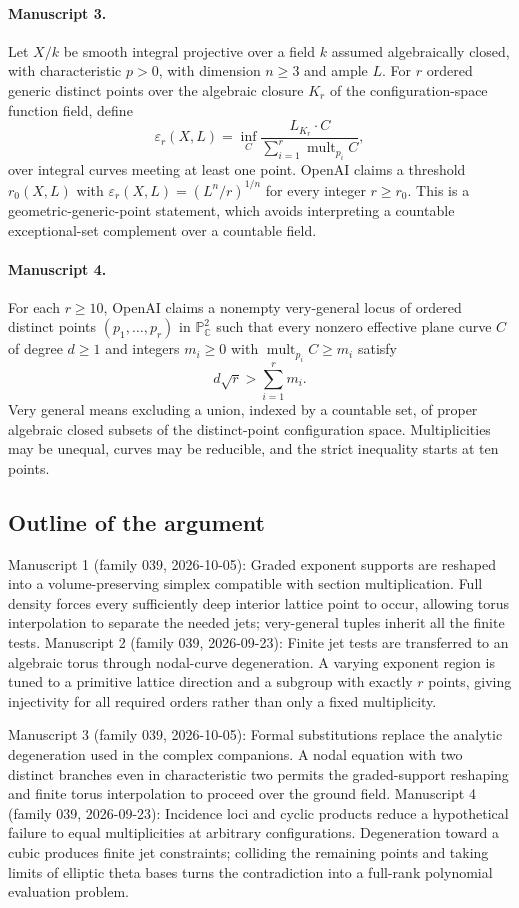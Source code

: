 \documentclass[11pt]{article}
\begin{document}
\paragraph{Manuscript 3.}
Let $X/k$ be smooth integral projective over a field $k$ assumed algebraically closed, with characteristic $p>0$, with dimension $n\ge3$ and ample $L$. For $r$ ordered generic distinct points over the algebraic closure $K_r$ of the configuration-space function field, define
\[
\varepsilon_r(X,L)=\inf_C\frac{L_{K_r}\cdot C}{\sum_{i=1}^r\operatorname{mult}_{p_i}C},
\]
over integral curves meeting at least one point. OpenAI claims a threshold $r_0(X,L)$ with $\varepsilon_r(X,L)=(L^n/r)^{1/n}$ for every integer $r\ge r_0$. This is a geometric-generic-point statement, which avoids interpreting a countable exceptional-set complement over a countable field.

\paragraph{Manuscript 4.}
For each $r\ge10$, OpenAI claims a nonempty very-general locus of ordered distinct points $(p_1,\ldots,p_r)$ in $\mathbb P^2_{\mathbb C}$ such that every nonzero effective plane curve $C$ of degree $d\ge1$ and integers $m_i\ge0$ with $\operatorname{mult}_{p_i}C\ge m_i$ satisfy
\[
d\sqrt r>\sum_{i=1}^r m_i.
\]
Very general means excluding a union, indexed by a countable set, of proper algebraic closed subsets of the distinct-point configuration space. Multiplicities may be unequal, curves may be reducible, and the strict inequality starts at ten points.

\subsection{Outline of the argument}
Manuscript 1 (family 039, 2026-10-05): Graded exponent supports are reshaped into a volume-preserving simplex compatible with section multiplication. Full density forces every sufficiently deep interior lattice point to occur, allowing torus interpolation to separate the needed jets; very-general tuples inherit all the finite tests. Manuscript 2 (family 039, 2026-09-23): Finite jet tests are transferred to an algebraic torus through nodal-curve degeneration. A varying exponent region is tuned to a primitive lattice direction and a subgroup with exactly $r$ points, giving injectivity for all required orders rather than only a fixed multiplicity.

Manuscript 3 (family 039, 2026-10-05): Formal substitutions replace the analytic degeneration used in the complex companions. A nodal equation with two distinct branches even in characteristic two permits the graded-support reshaping and finite torus interpolation to proceed over the ground field. Manuscript 4 (family 039, 2026-09-23): Incidence loci and cyclic products reduce a hypothetical failure to equal multiplicities at arbitrary configurations. Degeneration toward a cubic produces finite jet constraints; colliding the remaining points and taking limits of elliptic theta bases turns the contradiction into a full-rank polynomial evaluation problem.
\end{document}
